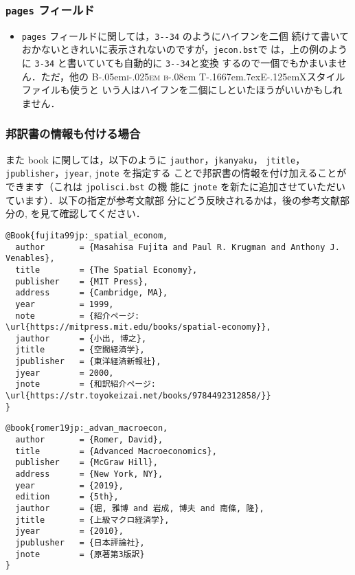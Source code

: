 \documentclass[article]{jlreq}
\newcommand{\BibTeX}{\textrm{B\kern-.05em\textsc{i\kern-.025em b}\kern-.08em%
T\kern-.1667em\lower.7ex\hbox{E}\kern-.125emX}}
\begin{document}
\subsubsection{\texttt{pages} フィールド}

\begin{itemize}
 \item \texttt{pages} フィールドに関しては，\verb|3--34| のようにハイフンを二個
       続けて書いておかないときれいに表示されないのですが，\texttt{jecon.bst}で
       は，上の例のように \verb|3-34| と書いていても自動的に \verb|3--34|と変換
       するので一個でもかまいません．ただ，他の \BibTeX スタイルファイルも使うと
       いう人はハイフンを二個にしといたほうがいいかもしれません．
\end{itemize}

\subsubsection{邦訳書の情報も付ける場合} \label{sec:hoyakusho}

また book に関しては，以下のように \texttt{jauthor}，\texttt{jkanyaku}，
\texttt{jtitle}，\texttt{jpublisher}，\texttt{jyear}, \texttt{jnote} を指定する
ことで邦訳書の情報を付け加えることができます（これは \texttt{jpolisci.bst} の機
能に \texttt{jnote} を新たに追加させていただいています）．以下の指定が参考文献部
分にどう反映されるかは，後の参考文献部分の\cite{fujita99jp:_spatial_econom},
\cite{romer19jp:_advan_macroecon}を見て確認してください．\\

\begin{screen}
 \begin{verbatim}
@Book{fujita99jp:_spatial_econom,
  author       = {Masahisa Fujita and Paul R. Krugman and Anthony J. Venables},
  title        = {The Spatial Economy},
  publisher    = {MIT Press},
  address      = {Cambridge, MA},
  year         = 1999,
  note         = {紹介ページ: \url{https://mitpress.mit.edu/books/spatial-economy}},
  jauthor      = {小出, 博之},
  jtitle       = {空間経済学},
  jpublisher   = {東洋経済新報社},
  jyear        = 2000,
  jnote        = {和訳紹介ページ: \url{https://str.toyokeizai.net/books/9784492312858/}}
}
 \end{verbatim}
\end{screen}
\vspace*{1em}
\begin{screen}
 \begin{verbatim}
@book{romer19jp:_advan_macroecon,
  author       = {Romer, David},
  title        = {Advanced Macroeconomics},
  publisher    = {McGraw Hill},
  address      = {New York, NY},
  year         = {2019},
  edition      = {5th},
  jauthor      = {堀, 雅博 and 岩成, 博夫 and 南條, 隆},
  jtitle       = {上級マクロ経済学},
  jyear        = {2010},
  jpublusher   = {日本評論社},
  jnote        = {原著第3版訳}
}
 \end{verbatim}
\end{screen}
\vspace*{1em}
\end{document}
